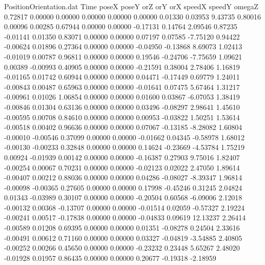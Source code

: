 \begin{filecontents}{PositionOrientation.dat}
Time poseX poseY orZ orY orX speedX speedY omegaZ
   0.72817    0.00000    0.00000     0.00000    0.00000    0.00000    0.01330    0.03953    9.43735
   0.80016    0.00096    0.00285     0.67944    0.00000    0.00000   -0.17131    0.14764    2.09546
   0.87235   -0.01141    0.01350     0.83071    0.00000    0.00000    0.07197    0.07585   -7.75120
   0.94422   -0.00624    0.01896     0.27364    0.00000    0.00000   -0.04950   -0.13868    8.69073
   1.02413   -0.01019    0.00787     0.96811    0.00000    0.00000    0.19546   -0.24706   -7.75659
   1.09621    0.00389   -0.00993     0.40905    0.00000    0.00000   -0.21591    0.38004    2.78406
   1.16819   -0.01165    0.01742     0.60944    0.00000    0.00000    0.04471   -0.17449    0.69779
   1.24011   -0.00843    0.00487     0.65963    0.00000    0.00000   -0.01641    0.07475    5.67464
   1.31217   -0.00961    0.01026     1.06854    0.00000    0.00000    0.01600    0.03867   -6.07053
   1.38419   -0.00846    0.01304     0.63136    0.00000    0.00000    0.03496   -0.08297    2.98641
   1.45610   -0.00595    0.00708     0.84610    0.00000    0.00000    0.00953   -0.03822    1.50251
   1.53614   -0.00518    0.00402     0.96636    0.00000    0.00000    0.07067   -0.13185   -8.28082
   1.60804   -0.00010   -0.00546     0.37099    0.00000    0.00000   -0.01662    0.04345   -0.58978
   1.68012   -0.00130   -0.00233     0.32848    0.00000    0.00000    0.14624   -0.23669   -4.53784
   1.75219    0.00924   -0.01939     0.00142    0.00000    0.00000   -0.16387    0.27903    9.75016
   1.82407   -0.00254    0.00067     0.70231    0.00000    0.00000   -0.02123    0.02022    2.47050
   1.89614   -0.00407    0.00212     0.88036    0.00000    0.00000    0.04286   -0.08027   -8.39347
   1.96814   -0.00098   -0.00365     0.27605    0.00000    0.00000    0.17998   -0.45246    0.31245
   2.04824    0.01343   -0.03989     0.30107    0.00000    0.00000   -0.20504    0.60568   -6.09006
   2.12018   -0.00132    0.00368    -0.13707    0.00000    0.00000   -0.01514    0.02059   -0.57327
   2.19224   -0.00241    0.00517    -0.17838    0.00000    0.00000   -0.04833    0.09619   12.13237
   2.26414   -0.00589    0.01208     0.69395    0.00000    0.00000    0.01351   -0.08278    0.24504
   2.33616   -0.00491    0.00612     0.71160    0.00000    0.00000    0.03327   -0.04819   -3.54885
   2.40805   -0.00252    0.00266     0.45650    0.00000    0.00000   -0.23232    0.23448    5.65267
   2.48020   -0.01928    0.01957     0.86435    0.00000    0.00000    0.20677   -0.19318   -2.18959

\end{filecontents}
